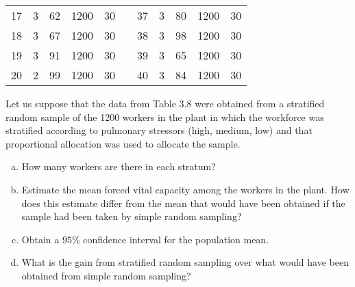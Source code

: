 \documentclass[12pt]{article}
\begin{document}
\begin{table}[ht]
\begin{longtable}[c]{lllllllllll}
            17     & 3        & 62  & 1200    & 30  &  & 37     & 3        & 80  & 1200    & 30  \\
            18     & 3        & 67  & 1200    & 30  &  & 38     & 3        & 98  & 1200    & 30  \\
            19     & 3        & 91  & 1200    & 30  &  & 39     & 3        & 65  & 1200    & 30  \\
            20     & 2        & 99  & 1200    & 30  &  & 40     & 3        & 84  & 1200    & 30  \\ \hline
        \end{longtable}
    \end{table}
    

    \begin{exercise}[Levy-6.2]
        Let us suppose that the data from Table 3.8 were obtained from a stratified random sample of the 1200 workers in the plant in which the workforce was stratified according to pulmonary stressors (high, medium, low) and that proportional allocation was used to allocate the sample. 
        \begin{enumerate}[a. ]
            \item How many workers are there in each stratum? 
            \item Estimate the mean forced vital capacity among the workers in the plant.
            How does this estimate differ from the mean that would have been obtained if the sample had been taken by simple random sampling? 
            \item Obtain a $95\%$ confidence interval for the population mean.
            \item What is the gain from stratified random sampling over what would have been obtained from simple random sampling?
        \end{enumerate}
    \end{exercise}
\end{document}
